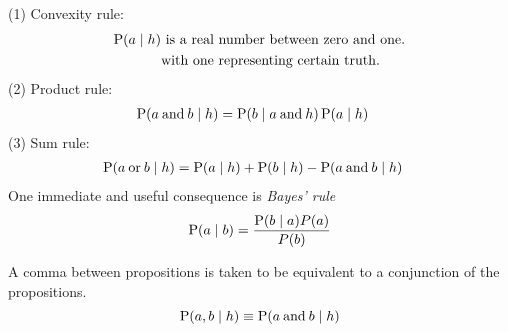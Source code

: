 \documentclass[Lectures.tex]{subfiles}
\begin{document}
\noindent (1) Convexity rule:
\begin{align*}
\operatorname{P}(a\mathrel{\vert} h) & \text{ is a real number between zero and one.}
\\ \notag
& \text{with one representing certain truth.}
\end{align*}
(2) Product rule: 
\begin{align*}
\operatorname{P}(a \mathbin{\text{and}} b\mathrel{\vert}  h) &= \operatorname{P}(b \mathrel{\vert} a \mathbin{\text{and}}   h) \operatorname{P}(a\mathrel{\vert} h)
\end{align*}
(3) Sum rule:
\begin{align*}
\operatorname{P}(a \mathbin{\text{or}}  b \mathrel{\vert} h ) & = \operatorname{P}(a\mathrel{\vert} h) + \operatorname{P}(b\mathrel{\vert} h) - \operatorname{P}(a \mathbin{\text{and}} b\mathrel{\vert} h)
\end{align*}
One immediate and useful consequence is {\sl Bayes' rule}
\[
\operatorname{P}(a \mathrel{\vert} b ) = \frac{\operatorname{P}(b\mathrel{\vert} a) P(a)}{P(b)}
\]

A comma between propositions is taken to be equivalent to a conjunction of the propositions. 
\[\operatorname{P}(a,b\mathrel{\vert} h) \equiv \operatorname{P}(a \mathbin{\text{and}} b\mathrel{\vert} h)\]





%
%
%
%
%
%
%
\end{document}
